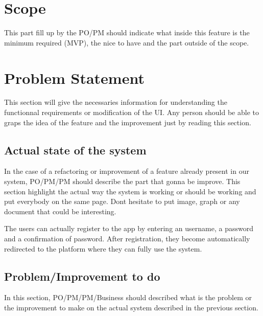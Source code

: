 \documentclass[a4paper,article,oneside]{memoir}
\begin{document}
        \section{Scope}
        This part fill up by the \gls{PO}/\gls{PM} should indicate what inside this feature is the minimum required (MVP), the nice to have and the part outside of the scope.

\noindent{}


        \section{Problem Statement}
        This section will give the necessaries information for understanding the functionnal requirements or modification of the UI. Any person should be able to graps the idea of the feature and the improvement just by reading this section.
        \subsection{Actual state of the system}
        	In the case of a refactoring or improvement of a feature already present in our system, \gls{PO}/\gls{PM}/\gls{PM} should describe the part that gonna be improve. This section highlight the actual way the system is working or should be working and put everybody on the same page. Dont hesitate to put image, graph or any document that could be interesting.
        
        \noindent{}
        
        The users can actually register to the app by entering an username, a password and a confirmation of password. After registration, they become automatically redirected to the platform where they can fully use the system.
        \subsection{Problem/Improvement to do}
        In this section, \gls{PO}/\gls{PM}/\gls{PM}/\gls{Business} should described what is the problem or the improvement to make on the actual system described in the previous section.
        
\end{document}

